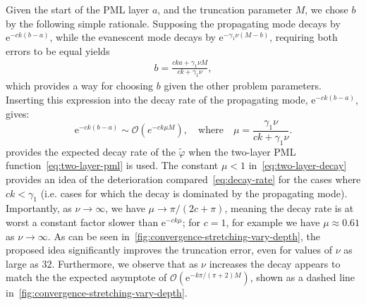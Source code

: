 \documentclass[review,hidelinks,onefignum,onetabnum]{siamart220329}
\newcommand{\e}{\mathrm{e}}
\newcommand{\tvarphi}{\widetilde \varphi}
\begin{document}
Given the start of the PML layer $a$, and the truncation parameter $M$, we chose $b$ by the following simple rationale. Supposing the propagating mode decays by $\e^{-ck(b-a)}$, while the evanescent mode decays by $\e^{-\gamma_1 \nu (M-b)}$, requiring both errors to be equal yields
\begin{align}
 b = \frac{cka + \gamma_1 \nu M}{ck+\gamma_1 \nu},
\end{align} 
which provides a way for choosing $b$ given the other problem parameters. Inserting this expression into the decay rate of the propagating mode, $\e^{-ck(b-a)}$, gives:
\begin{equation}
    \e^{-ck(b-a)} \sim \mathcal{O}(e^{-ck \mu M}), \quad \mbox{where} \quad \mu = \frac{\gamma_1 \nu}{ck + \gamma_1 \nu}.
    \label{eq:two-layer-decay}
\end{equation}
 provides the expected decay rate of the $\tvarphi$ when the two-layer PML function~\cref{eq:two-layer-pml} is used. The constant $\mu < 1$ in~\cref{eq:two-layer-decay} provides an idea of the deterioration compared~\cref{eq:decay-rate} for the cases where $ck < \gamma_1$ (i.e. cases for which the decay is dominated by the propagating mode). Importantly, as $\nu \to \infty$, we have $\mu \to \pi / (2c + \pi)$, meaning the decay rate is at worst a constant factor slower than $\e^{-ck\mu}$; for $c = 1$, for example we have $\mu \approx 0.61$ as $\nu \to \infty$. As can be seen in~\cref{fig:convergence-stretching-vary-depth}, the proposed idea significantly improves the truncation error, even for values of $\nu$ as large as $32$. Furthermore, we observe that as $\nu$ increases the decay appears to match the the expected asymptote of $\mathcal{O}(\e^{-k \pi/(\pi+2)M})$, shown as a dashed line in~\cref{fig:convergence-stretching-vary-depth}. 
%
\end{document}

